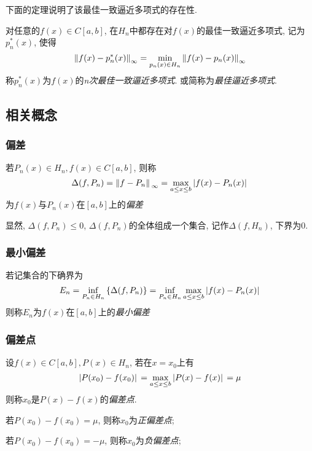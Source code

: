 下面的定理说明了该最佳一致逼近多项式的存在性.

\begin{theorem}[Borel定理]
    对任意的$f(x)\in C[a,b]$, 在$H_n$中都存在对$f(x)$的最佳一致逼近多项式, 记为$p_n^*(x)$, 使得
    \begin{equation*}
        \norm{f(x)-p_n^*(x)}_\infty=\min_{p_n(x)\in H_n}\norm{f(x)-p_n(x)}_\infty
    \end{equation*}
    称$p_n^*(x)$为$f(x)$的\emph{n次最佳一致逼近多项式}. 或简称为\emph{最佳逼近多项式}.
\end{theorem}

\subsection{相关概念}

\subsubsection{偏差}

\begin{definition}[偏差]
    若$P_n(x)\in H_n, f(x)\in C[a,b]$, 则称
    \begin{equation*}
        \Delta(f,P_n)=\norm*{f-P_n}_\infty=\max_{a\le x\le b}\abs*{f(x)-P_n(x)}
    \end{equation*}
    为$f(x)$与$P_n(x)$在$[a,b]$上的\emph{偏差}
\end{definition}

显然, $\Delta(f,P_n)\le 0$, ${\Delta(f,P_n)}$的全体组成一个集合, 记作$\Delta(f,H_n)$, 下界为0.

\subsubsection{最小偏差}

\begin{definition}
    若记集合的下确界为
    \begin{equation*}
        E_n=\inf_{P_n\in H_n}\left\{\Delta(f,P_n)\right\}=\inf_{P_n\in H_n}\max_{a\le x\le b}\abs*{f(x)-P_n(x)}
    \end{equation*}
    则称$E_n$为$f(x)$在$[a,b]$上的\emph{最小偏差}
\end{definition}

\subsubsection{偏差点}

\begin{definition}[偏差点]
    设$f(x)\in C[a,b], P(x)\in H_n$, 若在$x=x_0$上有
    \begin{equation*}
        \abs*{P(x_0)-f(x_0)}=\max_{a\le x\le b}\abs*{P(x)-f(x)}=\mu
    \end{equation*}
    则称$x_0$是$P(x)-f(x)$的\emph{偏差点}.

    若$P(x_0)-f(x_0)=\mu$, 则称$x_0$为\emph{正偏差点};

    若$P(x_0)-f(x_0)=-\mu$, 则称$x_0$为\emph{负偏差点};
\end{definition}

